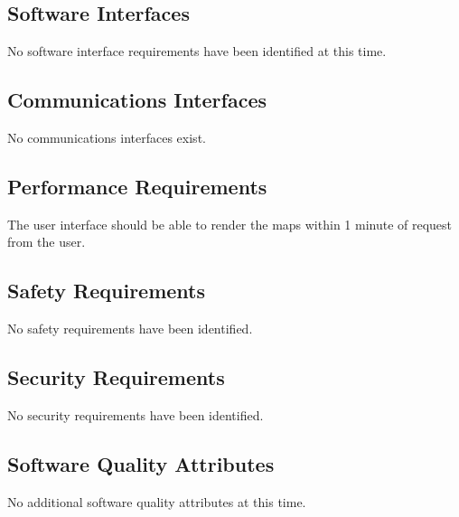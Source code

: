 \documentclass[12pt, letterpaper]{article}
\begin{document}
    \subsection{Software Interfaces}
     No software interface requirements have been identified at this time.
  \subsection{Communications Interfaces}
  No communications interfaces exist.

  \subsection{Performance Requirements}
  The user interface should be able to render the maps within 1 minute of request from the user.

  \subsection{Safety Requirements}
  No safety requirements have been identified.
  \subsection{Security Requirements}
  No security requirements have been identified.
  \subsection{Software Quality Attributes}
	No additional software quality attributes at this time.

%
%
%
% 
\end{document}
